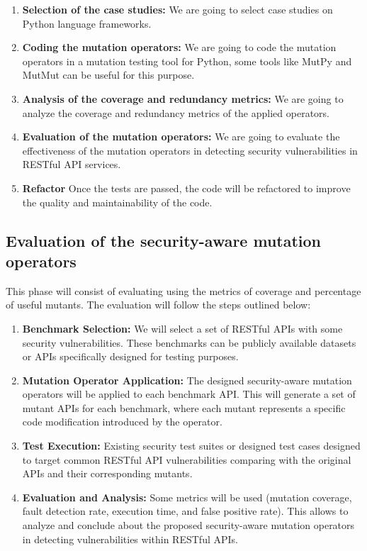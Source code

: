 \begin{enumerate}
  \item \textbf{Selection of the case studies:} We are going to select case studies on Python language frameworks.
  \item \textbf{Coding the mutation operators:} We are going to code the mutation operators in a mutation testing tool for Python, some tools like MutPy and MutMut can be useful for this purpose.
  \item \textbf{Analysis of the coverage and redundancy metrics:} We are going to analyze the coverage and redundancy metrics of the applied operators.
  \item \textbf{Evaluation of the mutation operators:} We are going to evaluate the effectiveness of the mutation operators in detecting security vulnerabilities in RESTful API services.
  \item \textbf{Refactor} Once the tests are passed, the code will be refactored to improve the quality and maintainability of the code.
\end{enumerate}

\subsection{Evaluation of the security-aware mutation operators}

This phase will consist of evaluating using the metrics of coverage and percentage of useful mutants. The evaluation will follow the steps outlined below:

\begin{enumerate}
  \item \textbf{Benchmark Selection:} We will select a set of RESTful APIs with some security vulnerabilities. These benchmarks can be publicly available datasets or APIs specifically designed for testing purposes.
  \item \textbf{Mutation Operator Application:} The designed security-aware mutation operators will be applied to each benchmark API. This will generate a set of mutant APIs for each benchmark, where each mutant represents a specific code modification introduced by the operator.
  \item \textbf{Test Execution:} Existing security test suites or designed test cases designed to target common RESTful API vulnerabilities comparing with the original APIs and their corresponding mutants.
  \item \textbf{Evaluation and Analysis:} Some metrics will be used (mutation coverage, fault detection rate, execution time, and false positive rate). This allows to analyze and conclude about the proposed security-aware mutation operators in detecting vulnerabilities within RESTful APIs.
\end{enumerate}

